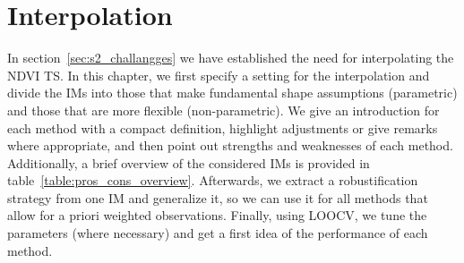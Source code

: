 \newcommand{\RobItPlot}{fitted to different (SCL45) NDVI {TS}. Iterations of a robustifying refit (as indicated in section~\ref{sec:loess_robustify}) are also displayed.}


\chapter{Interpolation} \label{sec:itpl}
	{%
		In section~\ref{sec:s2_challangges} we have established the need for interpolating the NDVI {TS}. In this chapter, we first specify a setting for the interpolation and divide the {{IM}}s into those that make fundamental shape assumptions (parametric) and those that are more flexible (non-parametric). We give an introduction for each method with a compact definition, highlight adjustments or give remarks where appropriate, and then point out strengths and weaknesses of each method. Additionally, a brief overview of the considered {{IM}}s is provided in table~\ref{table:pros_cons_overview}.
		Afterwards, we extract a robustification strategy from one {{IM}} and generalize it, so we can use it for all methods that allow for a priori weighted observations. Finally, using LOOCV, we tune the parameters (where necessary) and get a first idea of the performance of each method.


	}
	{%
		\footnotesize
		
		\normalsize
	}



